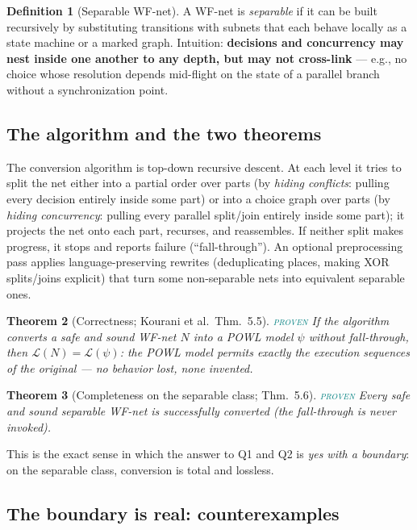 \documentclass[11pt]{article}
\newcommand{\PROVEN}{\textcolor{teal}{\textsc{proven}}}
\theoremstyle{definition}
\newtheorem{definition}{Definition}[section]
\theoremstyle{plain}
\newtheorem{theorem}[definition]{Theorem}
\theoremstyle{remark}
\begin{document}
\begin{definition}[Separable WF-net]
A WF-net is \emph{separable} if it can be built recursively by substituting
transitions with subnets that each behave locally as a state machine or a
marked graph. Intuition: \textbf{decisions and concurrency may nest inside
one another to any depth, but may not cross-link} --- e.g., no choice whose
resolution depends mid-flight on the state of a parallel branch without a
synchronization point.
\end{definition}

\subsection{The algorithm and the two theorems}

The conversion algorithm is top-down recursive descent. At each level it
tries to split the net either into a partial order over parts (by
\emph{hiding conflicts}: pulling every decision entirely inside some part)
or into a choice graph over parts (by \emph{hiding concurrency}: pulling
every parallel split/join entirely inside some part); it projects the net
onto each part, recurses, and reassembles. If neither split makes progress,
it stops and reports failure (``fall-through''). An optional preprocessing
pass applies language-preserving rewrites (deduplicating places, making
XOR splits/joins explicit) that turn some non-separable nets into
equivalent separable ones.

\begin{theorem}[Correctness; Kourani et al.\ Thm.\ 5.5]\PROVEN\;
If the algorithm converts a safe and sound WF-net $N$ into a POWL model
$\psi$ without fall-through, then $\mathcal{L}(N) = \mathcal{L}(\psi)$:
the POWL model permits \emph{exactly} the execution sequences of the
original --- no behavior lost, none invented.
\end{theorem}

\begin{theorem}[Completeness on the separable class; Thm.\ 5.6]\PROVEN\;
Every safe and sound \emph{separable} WF-net is successfully converted
(the fall-through is never invoked).
\end{theorem}

This is the exact sense in which the answer to Q1 and Q2 is \emph{yes with
a boundary}: on the separable class, conversion is total and lossless.

\subsection{The boundary is real: counterexamples}
\end{document}
